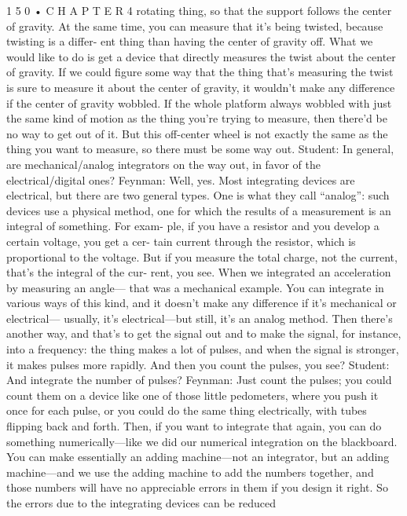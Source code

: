 \documentclass[10pt,oneside]{article}
\begin{document}
1 5 0 • C H A P T E R  4 rotating thing, so that the support follows the center of gravity. At the same time, you can measure that it’s being twisted, because twisting is a differ- ent thing than having the center of gravity off. What we would like to do is get a device that directly measures the twist about the center of gravity. If we could figure some way that the thing that’s measuring the twist is sure to measure it about the center of gravity, it wouldn’t make any difference if the center of gravity wobbled. If the whole platform always wobbled with just the same kind of motion as the thing you’re trying to measure, then there’d be no way to get out of it. But this off-center wheel is not exactly the same as the thing you want to measure, so there must be some way out. Student: In general, are mechanical/analog integrators on the way out, in favor of the electrical/digital ones? Feynman: Well, yes. Most integrating devices are electrical, but there are two general types. One is what they call “analog”: such devices use a physical method, one for which the results of a measurement is an integral of something. For exam- ple, if you have a resistor and you develop a certain voltage, you get a cer- tain current through the resistor, which is proportional to the voltage. But if you measure the total charge, not the current, that’s the integral of the cur- rent, you see. When we integrated an acceleration by measuring an angle--- that was a mechanical example. You can integrate in various ways of this kind, and it doesn’t make any difference if it’s mechanical or electrical--- usually, it’s electrical---but still, it’s an analog method. Then there’s another way, and that’s to get the signal out and to make the signal, for instance, into a frequency: the thing makes a lot of pulses, and when the signal is stronger, it makes pulses more rapidly. And then you count the pulses, you see? Student: And integrate the number of pulses? Feynman: Just count the pulses; you could count them on a device like one of those little pedometers, where you push it once for each pulse, or you could do the same thing electrically, with tubes flipping back and forth. Then, if you want to integrate that again, you can do something numerically---like we did our numerical integration on the blackboard. You can make essentially an adding machine---not an integrator, but an adding machine---and we use the adding machine to add the numbers together, and those numbers will have no appreciable errors in them if you design it right. So the errors due to the integrating devices can be reduced\par
\end{document}
